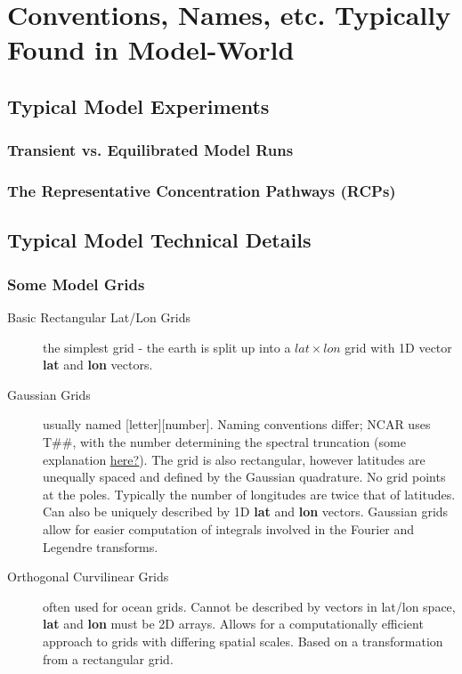 \documentclass{article}
\begin{document}



\appendix
\section{Conventions, Names, etc. Typically Found in Model-World}
\subsection{Typical Model Experiments}
\subsubsection{Transient vs. Equilibrated Model Runs}


\subsubsection{The Representative Concentration Pathways (RCPs)}


\subsection{Typical Model Technical Details}

\subsubsection{Some Model Grids}
\begin{description}
\item [Basic Rectangular Lat/Lon Grids] the simplest grid - the earth is split up into a $lat\times lon$ grid with 1D vector \textbf{lat} and \textbf{lon} vectors. 
\item [Gaussian Grids] usually named [letter][number]. Naming conventions differ; NCAR uses T\#\#, with the number determining the spectral truncation (some explanation  \href{https://software.ecmwf.int/wiki/display/FCST/Relationship+between+spectral+truncation+and+grid+point+resolution}{\underline{here?}}). The grid is also rectangular, however latitudes are unequally spaced and defined by the Gaussian quadrature. No grid points at the poles. Typically the number of longitudes are twice that of latitudes. Can also be uniquely described by 1D \textbf{lat} and \textbf{lon} vectors. Gaussian grids allow for easier computation of integrals involved in the Fourier and Legendre transforms. 
\item [Orthogonal Curvilinear Grids] often used for ocean grids. Cannot be described by vectors in lat/lon space, \textbf{lat} and \textbf{lon} must be 2D arrays. Allows for a computationally efficient approach to grids with differing spatial scales. Based on a transformation from a rectangular grid. 
\end{description}
\end{document}
